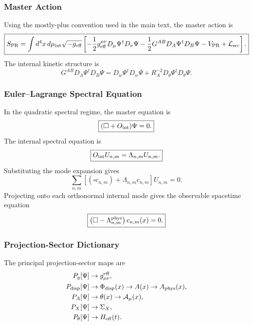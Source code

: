 \documentclass[11pt]{article}
\begin{document}
\subsubsection{Master Action}
\label{app:master-action}

Using the mostly-plus convention used in the main text, the master action is
\begin{equation}
\boxed{
S_{\rm PR}
=
\int d^4x\,d\mu_{\rm int}
\sqrt{-g_{\rm eff}}
\left[
-\frac12
g_{\rm eff}^{\mu\nu}
D_\mu\Psi^\dagger
D_\nu\Psi
-
\frac12
G^{AB}
D_A\Psi^\dagger
D_B\Psi
-
V_{\rm PR}
+
\mathcal L_{\rm src}
\right].
}
\end{equation}
The internal kinetic structure is
\begin{equation}
\boxed{
G^{AB}
D_A\Psi^\dagger D_B\Psi
=
D_w\Psi^\dagger D_w\Psi
+
R_A^{-2}
D_\theta\Psi^\dagger D_\theta\Psi.
}
\end{equation}

\subsubsection{Euler--Lagrange Spectral Equation}
\label{app:euler}

In the quadratic spectral regime, the master equation is
\begin{equation}
\boxed{
(\square+O_{\rm int})\Psi=0.
}
\end{equation}
The internal spectral equation is
\begin{equation}
\boxed{
O_{\rm int}U_{n,m}
=
\Lambda_{n,m}U_{n,m}.
}
\end{equation}
Substituting the mode expansion gives
\begin{equation}
\boxed{
\sum_{n,m}
\left[
(\square c_{n,m})
+
\Lambda_{n,m}c_{n,m}
\right]
U_{n,m}
=
0.
}
\end{equation}
Projecting onto each orthonormal internal mode gives the observable spacetime equation
\begin{equation}
\boxed{
\left(
\square
-
\Lambda_{n,m}^{\rm phys}
\right)c_{n,m}(x)
=
0.
}
\end{equation}

\subsubsection{Projection-Sector Dictionary}
\label{app:projection-dictionary}

The principal projection-sector maps are
\begin{align}
P_g[\Psi]
&\rightarrow
g_{\mu\nu}^{\rm eff},
\\
P_{\rm disp}[\Psi]
&\rightarrow
\Phi_{\rm disp}(x)
\rightarrow
A(x)
\rightarrow
A_{\rm phys}(x),
\\
P_A[\Psi]
&\rightarrow
\theta(x)
\rightarrow
\mathcal A_\mu(x),
\\
P_X[\Psi]
&\rightarrow
\Sigma_X,
\\
P_\theta[\Psi]
&\rightarrow
H_{\rm eff}(t).
\end{align}
\end{document}
